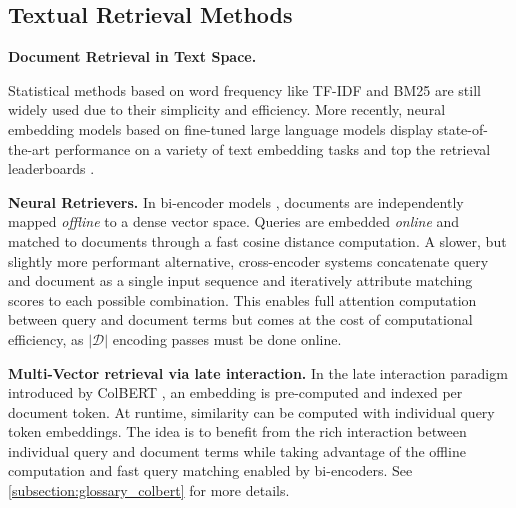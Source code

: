 \documentclass{article} %
\begin{document}
\subsection{Textual Retrieval Methods}
\noindent\textbf{Document Retrieval in Text Space.}

Statistical methods based on word frequency like TF-IDF \citep{sparck_jones_statistical_1972} and BM25 \citep{robertson_okapi_1994} are still widely used due to their simplicity and efficiency. More recently, neural embedding models based on fine-tuned large language models display state-of-the-art performance on a variety of text embedding tasks and top the retrieval leaderboards \citep{muennighoff_mteb_2022}. 

\noindent\textbf{Neural Retrievers.}
In bi-encoder models \citep{reimers_sentence-bert_2019, karpukhin_dense_2020, wang_text_2022}, documents are independently mapped \textit{offline} to a dense vector space. Queries are embedded \textit{online} and matched to documents through a fast cosine distance computation.
A slower, but slightly more performant alternative, cross-encoder systems \citep{wang_minilm_2020, cohere_introducing_2024} concatenate query and document as a single input sequence and iteratively attribute matching scores to each possible combination. This enables full attention computation between query and document terms but comes at the cost of computational efficiency, as $|\mathcal{D}|$ encoding passes must be done online.


\noindent\textbf{Multi-Vector retrieval via late interaction.}
In the late interaction paradigm introduced by ColBERT \citep{khattab_colbert_2020}, an embedding is pre-computed and indexed per document token. At runtime, similarity can be computed with individual query token embeddings. The idea is to benefit from the rich interaction between individual query and document terms while taking advantage of the offline computation and fast query matching enabled by bi-encoders. See \autoref{subsection:glossary_colbert} for more details.

\end{document}
